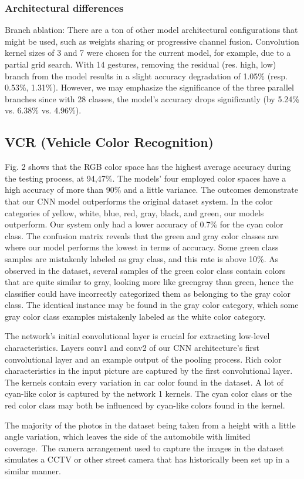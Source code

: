 \documentclass[letterpaper, 10 pt, conference]{ieeeconf}  %
\begin{document}
\subsubsection*{\bf Architectural differences}
Branch ablation: There are a ton of other model architectural configurations that might be used, such as weights sharing or progressive channel fusion. Convolution kernel sizes of 3 and 7 were chosen for the current model, for example, due to a partial grid search. With 14 gestures, removing the residual (res. high, low) branch from the model results in a slight accuracy degradation of 1.05\% (resp. 0.53\%, 1.31\%). However, we may emphasize the significance of the three parallel branches since with 28 classes, the model's accuracy drops significantly (by 5.24\% vs. 6.38\% vs. 4.96\%).

\subsection*{\bf VCR (Vehicle Color Recognition)}
Fig. 2 shows that the RGB color space has the highest average accuracy during the testing process, at 94,47\%. The models' four employed color spaces have a high accuracy of more than 90\% and a little variance. The outcomes demonstrate that our CNN model outperforms the original dataset system. In the color categories of yellow, white, blue, red, gray, black, and green, our models outperform. Our system only had a lower accuracy of 0.7\% for the cyan color class. The confusion matrix reveals that the green and gray color classes are where our model performs the lowest in terms of accuracy. Some green class samples are mistakenly labeled as gray class, and this rate is above 10\%. As observed in the dataset, several samples of the green color class contain colors that are quite similar to gray, looking more like greengray than green, hence the classifier could have incorrectly categorized them as belonging to the gray color class. The identical instance may be found in the gray color category, which some gray color class examples mistakenly labeled as the white color category. \par
The network's initial convolutional layer is crucial for extracting low-level characteristics. Layers conv1 and conv2 of our CNN architecture's first convolutional layer and an example output of the pooling process. Rich color characteristics in the input picture are captured by the first convolutional layer. The kernels contain every variation in car color found in the dataset. A lot of cyan-like color is captured by the network 1 kernels. The cyan color class or the red color class may both be influenced by cyan-like colors found in the kernel. \par
The majority of the photos in the dataset being taken from a height with a little angle variation, which leaves the side of the automobile with limited coverage. The camera arrangement used to capture the images in the dataset simulates a CCTV or other street camera that has historically been set up in a similar manner. \par
\end{document}

